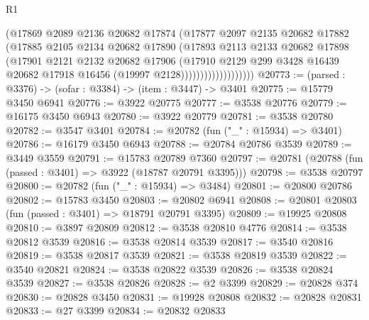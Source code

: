 \begin{lexlean}{R1}
\begin{coremodule}
                            (@17869
                              @2089
                              @2136
                              @20682
                              @17874
                              (@17877
                                @2097
                                @2135
                                @20682
                                @17882
                                (@17885
                                  @2105
                                  @2134
                                  @20682
                                  @17890
                                  (@17893
                                    @2113
                                    @2133
                                    @20682
                                    @17898
                                    (@17901
                                      @2121
                                      @2132
                                      @20682
                                      @17906
                                      (@17910
                                        @2129
                                        @299
                                        @3428
                                        @16439
                                        @20682
                                        @17918
                                        @16456
                                        (@19997 @2128)))))))))))))))))))
@20773 := (parsed : @3376) -> (sofar : @3384) -> (item : @3447) -> @3401
@20775 := @15779 @3450 @6941
@20776 := @3922 @20775
@20777 := @3538 @20776
@20779 := @16175 @3450 @6943
@20780 := @3922 @20779
@20781 := @3538 @20780
@20782 := @3547 @3401
@20784 := @20782 (fun ("_" : @15934) => @3401)
@20786 := @16179 @3450 @6943
@20788 := @20784 @20786 @3539
@20789 := @3449 @3559
@20791 := @15783 @20789 @7360
@20797 := @20781 (@20788 (fun (passed : @3401) => @3922 (@18787 @20791 @3395)))
@20798 := @3538 @20797
@20800 := @20782 (fun ("_" : @15934) => @3484)
@20801 := @20800 @20786
@20802 := @15783 @3450
@20803 := @20802 @6941
@20808 := @20801 @20803 (fun (passed : @3401) => @18791 @20791 @3395)
@20809 := @19925 @20808
@20810 := @3897 @20809
@20812 := @3538 @20810 @4776
@20814 := @3538 @20812 @3539
@20816 := @3538 @20814 @3539
@20817 := @3540 @20816
@20819 := @3538 @20817 @3539
@20821 := @3538 @20819 @3539
@20822 := @3540 @20821
@20824 := @3538 @20822 @3539
@20826 := @3538 @20824 @3539
@20827 := @3538 @20826
@20828 := @2 @3399
@20829 := @20828 @374
@20830 := @20828 @3450
@20831 := @19928 @20808
@20832 := @20828 @20831
@20833 := @27 @3399
@20834 := @20832 @20833

\end{coremodule}
\end{lexlean}
